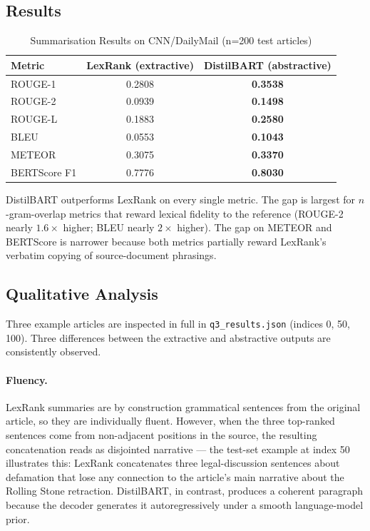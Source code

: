 \subsection{Results}

\begin{table}[h]
\centering
\caption{Summarisation Results on CNN/DailyMail (n=200 test articles)}
\label{tab:q3_results}
\begin{tabular}{lcc}
\toprule
Metric              & LexRank (extractive) & DistilBART (abstractive) \\
\midrule
ROUGE-1             & 0.2808 & \textbf{0.3538} \\
ROUGE-2             & 0.0939 & \textbf{0.1498} \\
ROUGE-L             & 0.1883 & \textbf{0.2580} \\
BLEU                & 0.0553 & \textbf{0.1043} \\
METEOR              & 0.3075 & \textbf{0.3370} \\
BERTScore F1        & 0.7776 & \textbf{0.8030} \\
\bottomrule
\end{tabular}
\end{table}

DistilBART outperforms LexRank on every single metric. The gap is
largest for $n$-gram-overlap metrics that reward lexical fidelity to the
reference (ROUGE-2 nearly $1.6\times$ higher; BLEU nearly $2\times$
higher). The gap on METEOR and BERTScore is narrower because both
metrics partially reward LexRank's verbatim copying of source-document
phrasings.

\subsection{Qualitative Analysis}

Three example articles are inspected in full in
\texttt{q3\_results.json} (indices 0, 50, 100). Three differences
between the extractive and abstractive outputs are consistently observed.

\paragraph{Fluency.}
LexRank summaries are by construction grammatical sentences from the
original article, so they are individually fluent. However, when the
three top-ranked sentences come from non-adjacent positions in the
source, the resulting concatenation reads as disjointed narrative ---
the test-set example at index 50 illustrates this: LexRank concatenates
three legal-discussion sentences about defamation that lose any
connection to the article's main narrative about the Rolling Stone
retraction. DistilBART, in contrast, produces a coherent paragraph
because the decoder generates it autoregressively under a smooth
language-model prior.

